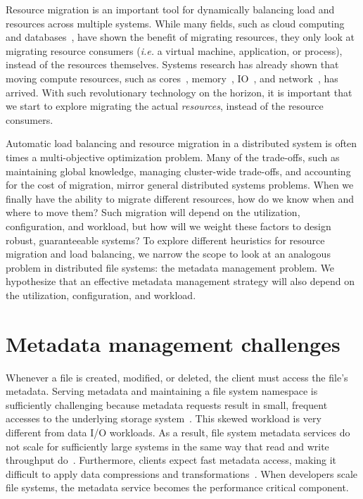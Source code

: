 
Resource migration is an important tool for dynamically balancing load and resources across multiple systems. While many fields, such as cloud computing~\cite{zhang:journal2010-cloud-challenges} and databases~\cite{elmore:sigmod2013-pythia}, have shown the benefit of migrating resources, they only look at migrating resource consumers ({\it i.e.} a virtual machine, application, or process), instead of the resources themselves. Systems research has already shown that moving compute resources, such as cores~\cite{zhang:journal2010-cloud-challenges}, memory~\cite{chapman:atc2009-vnuma}, IO~\cite{raj:hpdc2007-io-virtualization}, and network~\cite{georgiadis:atn1996-network-qos}, has arrived. With such revolutionary technology on the horizon, it is important that we start to explore migrating the actual {\it resources}, instead of the resource consumers.

Automatic load balancing and resource migration in a distributed system is often times a multi-objective optimization problem. Many of the trade-offs, such as maintaining global knowledge, managing cluster-wide trade-offs, and accounting for the cost of migration, mirror general distributed systems problems. When we finally have the ability to migrate different resources, how do we know when and where to move them? Such migration will depend on the utilization, configuration, and workload, but how will we weight these factors to design robust, guaranteeable systems? To explore different heuristics for resource migration and load balancing, we narrow the scope to look at an analogous problem in distributed file systems: the metadata management problem. We hypothesize that an effective metadata management strategy will also depend on the utilization, configuration, and workload. 

\section{Metadata management challenges}
Whenever a file is created, modified, or deleted, the client must access the file's metadata. Serving metadata and maintaining a file system namespace is sufficiently challenging because metadata requests result in small, frequent accesses to the underlying storage system~\cite{roselli:atec2000-FS-workloads}. This skewed workload is very different from data I/O workloads. As a result, file system metadata services do not scale for sufficiently large systems in the same way that read and write throughput do~\cite{abad:techreport2012-fstrace, abad:ucc2012-mimesis, alam:pdsw2011-metadata-scaling, weil:osdi2006-ceph}. Furthermore, clients expect fast metadata access, making it difficult to apply data compressions and transformations~\cite{leung:atc2008-nfs-trace}. When developers scale file systems, the metadata service becomes the performance critical component. 

